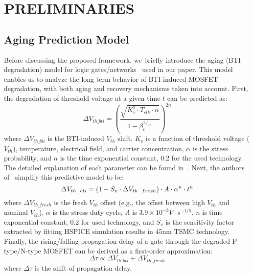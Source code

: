 \section{PRELIMINARIES}
\label{sec:preliminary}

\subsection{Aging Prediction Model}
\label{subsec:apm}
Before discussing the proposed framework, we briefly introduce the aging (BTI degradation) model for logic gates/networks~\cite{wang2010impact, wang2007efficient, gomez2016early} used in our paper. This model enables us to analyze the long-term behavior of BTI-induced MOSFET degradation, with both aging and recovery mechanisms taken into account. First, the degradation of threshold voltage at a given time $t$ can be predicted as:
\begin{equation}
\label{eq:dtv}
\Delta V_{th\_bti}=\left(\frac{\sqrt{K_v^2 \cdot T_{clk} \cdot \alpha}}{1-\beta_t^{1/_{2n}}}\right)^{2n}
\end{equation}
where $\Delta V_{th\_bti}$ is the BTI-induced $V_{th}$ shift, $K_v$ is a function of threshold voltage ($V_{th}$), temperature, electrical field, and carrier concentration, $\alpha$ is the stress probability, and $n$ is the time exponential constant, 0.2 for the used technology. The detailed explanation of each parameter can be found in~\cite{wang2010impact}. Next, the authors of~\cite{gomez2016early} simplify this predictive model to be:
\begin{equation}
	\centering
	\Delta V_{th\_bti} = (1 - S_{v} \cdot \Delta V_{th\_fresh})  \cdot A \cdot \alpha^n \cdot t^n
	\label{eq:cor}
\end{equation}
where $\Delta V_{th\_fresh}$ is the fresh $V_{th}$ offset (e.g., the offset between high $V_{th}$ and nominal $V_{th}$), $\alpha$ is the stress duty cycle, $A$ is $3.9 \times 10^{-3} V \cdot s^{-1/5}$, $n$ is time exponential constant, 0.2 for used technology, and $S_{v}$ is the sensitivity factor extracted by fitting HSPICE simulation results in 45nm TSMC technology.
Finally, the rising/falling propagation delay of a gate through the degraded P-type/N-type MOSFET can be derived as a first-order approximation:
\begin{equation}
	\label{eq:pd}
	\Delta \tau \propto \Delta V_{th\_bti} + \Delta V_{th\_fresh}
\end{equation}
where $\Delta \tau$ is the shift of propagation delay.

